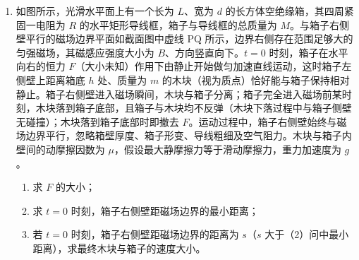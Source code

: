 \documentclass[\gkver]{gaokaozhenti}
\begin{document}
\begin{enumerate}
{解得 $r_{2} = \frac{5}{2}L$

由洛伦兹力提供向心力

$qv_{0}B_{2} = m\frac{v_{0}^{2}}{r_{2}}$

联立解得 $B_{2} = \frac{2mU}{5qB_{0}dL}$

其中 $B_{1} = \frac{mU}{qdB_{0}L}$

根据磁屏蔽效率 $\eta = \frac{B_{1} - B_{2}}{B_{1}} \times 100\%$ 可得若在 Q 处检测到该粒子，则 $\eta = 60\%$。
}

\item
如图所示，光滑水平面上有一个长为 $L$、宽为 $d$ 的长方体空绝缘箱，其四周紧固一电阻为 $R$ 的水平矩形导线框，箱子与导线框的总质量为 $M$。与箱子右侧壁平行的磁场边界平面如截面图中虚线 PQ 所示，边界右侧存在范围足够大的匀强磁场，其磁感应强度大小为 $B$、方向竖直向下。$t = 0$ 时刻，箱子在水平向右的恒力 $F$（大小未知）作用下由静止开始做匀加速直线运动，这时箱子左侧壁上距离箱底 $h$ 处、质量为 $m$ 的木块（视为质点）恰好能与箱子保持相对静止。箱子右侧壁进入磁场瞬间，木块与箱子分离；箱子完全进入磁场前某时刻，木块落到箱子底部，且箱子与木块均不反弹（木块下落过程中与箱子侧壁无碰撞）；木块落到箱子底部时即撤去 $F$。运动过程中，箱子右侧壁始终与磁场边界平行，忽略箱壁厚度、箱子形变、导线粗细及空气阻力。木块与箱子内壁间的动摩擦因数为 $\mu$，假设最大静摩擦力等于滑动摩擦力，重力加速度为 $g$。

\begin{enumerate}
\item
求 $F$ 的大小；
\item
求 $t = 0$ 时刻，箱子右侧壁距磁场边界的最小距离；
\item
若 $t = 0$ 时刻，箱子右侧壁距磁场边界的距离为 $s$（$s$ 大于（2）问中最小距离），求最终木块与箱子的速度大小。
\end{enumerate}


\end{enumerate}
\end{document}
